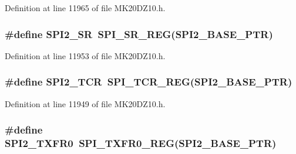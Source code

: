 Definition at line 11965 of file M\+K20\+D\+Z10.\+h.

\subsubsection[{\texorpdfstring{S\+P\+I2\+\_\+\+SR}{SPI2_SR}}]{\setlength{\rightskip}{0pt plus 5cm}\#define S\+P\+I2\+\_\+\+SR~{\bf S\+P\+I\+\_\+\+S\+R\+\_\+\+R\+EG}({\bf S\+P\+I2\+\_\+\+B\+A\+S\+E\+\_\+\+P\+TR})}\hypertarget{group___s_p_i___register___accessor___macros_ga42d844381f1f96dd5d969cccdab12144}{}\label{group___s_p_i___register___accessor___macros_ga42d844381f1f96dd5d969cccdab12144}


Definition at line 11953 of file M\+K20\+D\+Z10.\+h.

\subsubsection[{\texorpdfstring{S\+P\+I2\+\_\+\+T\+CR}{SPI2_TCR}}]{\setlength{\rightskip}{0pt plus 5cm}\#define S\+P\+I2\+\_\+\+T\+CR~{\bf S\+P\+I\+\_\+\+T\+C\+R\+\_\+\+R\+EG}({\bf S\+P\+I2\+\_\+\+B\+A\+S\+E\+\_\+\+P\+TR})}\hypertarget{group___s_p_i___register___accessor___macros_ga53a77d21da325c8ba82e78baa50bc967}{}\label{group___s_p_i___register___accessor___macros_ga53a77d21da325c8ba82e78baa50bc967}


Definition at line 11949 of file M\+K20\+D\+Z10.\+h.

\subsubsection[{\texorpdfstring{S\+P\+I2\+\_\+\+T\+X\+F\+R0}{SPI2_TXFR0}}]{\setlength{\rightskip}{0pt plus 5cm}\#define S\+P\+I2\+\_\+\+T\+X\+F\+R0~{\bf S\+P\+I\+\_\+\+T\+X\+F\+R0\+\_\+\+R\+EG}({\bf S\+P\+I2\+\_\+\+B\+A\+S\+E\+\_\+\+P\+TR})}\hypertarget{group___s_p_i___register___accessor___macros_ga9074718850c4771dfbd37187ca5f4959}{}\label{group___s_p_i___register___accessor___macros_ga9074718850c4771dfbd37187ca5f4959}


